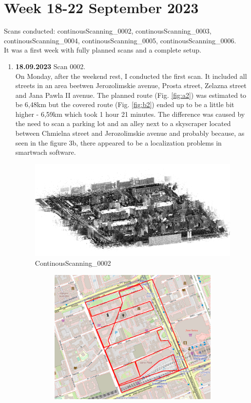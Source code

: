 \documentclass[a4paper,12pt]{book}
\begin{document}
\section{Week 18-22 September 2023}
Scans conducted: continousScanning\_0002, continousScanning\_0003, continousScanning\_0004, continousScanning\_0005, continousScanning\_0006.\\

It was a first week with fully planned scans and a complete setup. 
\begin{enumerate}
	\item \textbf{18.09.2023} Scan 0002. \\
	On Monday, after the weekend rest, I conducted the first scan. It included all streets in an area beetwen Jerozolimskie avenue, Prosta street, Zelazna street and Jana Pawla II avenue. The planned route (Fig. \ref{fig:a2}) was estimated to be 6,48km but the covered route (Fig. \ref{fig:b2}) ended up to be a little bit higher - 6,59km which took 1 hour 21 minutes. The difference was caused by the need to scan a parking lot and an alley next to a skyscraper located between Chmielna street and Jerozolimskie avenue and probably because, as seen in the figure 3b, there appeared to be a localization problems in smartwach software.
	\begin{figure}[H]
		\includegraphics[width=1\linewidth]{cloud2}
		\caption{ContinousScanning\_0002}
	\end{figure}
	\begin{figure}[H]
		\centering
		\begin{subfigure}{.90\textwidth}
			\centering
			\includegraphics[width=1\linewidth]{route_p2}

\end{subfigure}
\end{figure}
\end{enumerate}
\end{document}
